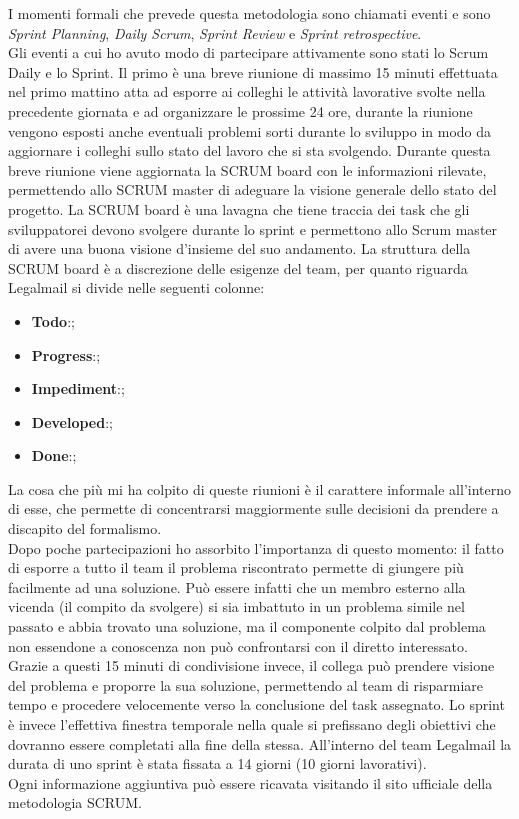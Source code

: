 I momenti formali che prevede questa metodologia sono chiamati eventi e sono \textit{Sprint Planning}, \textit{Daily Scrum}, \textit{Sprint Review} e \textit{Sprint retrospective}.\\
Gli eventi a cui ho avuto modo di partecipare attivamente sono stati lo Scrum Daily e lo Sprint. Il primo è una breve riunione di massimo 15 minuti effettuata nel primo mattino atta ad esporre ai colleghi le attività lavorative svolte nella precedente giornata e ad organizzare le prossime 24 ore, durante la riunione vengono esposti anche eventuali problemi sorti durante lo sviluppo in modo da aggiornare i colleghi sullo stato del lavoro che si sta svolgendo.
Durante questa breve riunione viene aggiornata la SCRUM board con le informazioni rilevate, permettendo allo SCRUM master di adeguare la visione generale dello stato del progetto.
La SCRUM board è una lavagna che tiene traccia dei task che gli sviluppatorei devono svolgere durante lo sprint e permettono allo Scrum master di avere una buona visione d'insieme del suo andamento. La struttura della SCRUM board è a discrezione delle esigenze del team, per quanto riguarda Legalmail si divide nelle seguenti colonne:
\begin{itemize}
	\item \textbf{Todo}:;
	\item \textbf{Progress}:;
	\item \textbf{Impediment}:;
	\item \textbf{Developed}:;
	\item \textbf{Done}:;
\end{itemize}

La cosa che più mi ha colpito di queste riunioni è il carattere informale all'interno di esse, che permette di concentrarsi maggiormente sulle decisioni da prendere a discapito del formalismo. \\
Dopo poche partecipazioni ho assorbito l'importanza di questo momento: il fatto di esporre a tutto il team il problema riscontrato permette di giungere più facilmente ad una soluzione. Può essere infatti che un membro esterno alla vicenda (il compito da svolgere) si sia imbattuto in un problema simile nel passato e abbia trovato una soluzione, ma il componente colpito dal problema non essendone a conoscenza non può confrontarsi con il diretto interessato. Grazie a questi 15 minuti di condivisione invece, il collega può prendere visione del problema e proporre la sua soluzione, permettendo al team di risparmiare tempo e procedere velocemente verso la conclusione del task assegnato.
Lo sprint è invece l'effettiva finestra temporale nella quale si prefissano degli obiettivi che dovranno essere completati alla fine della stessa. All'interno del team Legalmail la durata di uno sprint è stata fissata a 14 giorni (10 giorni lavorativi). \\
Ogni informazione aggiuntiva può essere ricavata visitando il sito ufficiale della metodologia SCRUM. %
